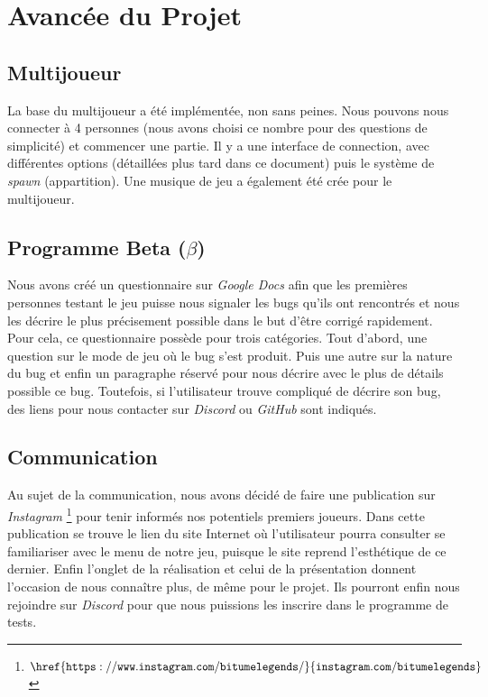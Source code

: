 \documentclass[12pt,a4paper]{article}
\begin{document}
\section{Avancée du Projet}
    \subsection{Multijoueur}
        La base du multijoueur a été implémentée, non sans peines. 
        Nous pouvons nous connecter à 4 personnes (nous avons choisi ce nombre pour des questions 
        de simplicité) et commencer une partie. Il y a une interface de connection, avec différentes 
        options (détaillées plus tard dans ce document) puis le système de \textit{spawn} (appartition).
        Une musique de jeu a également été crée pour le multijoueur.
  
    \subsection{Programme Beta (\(\beta\))}
        Nous avons créé un questionnaire sur \textsl{Google Docs} afin que les premières personnes testant
        le jeu puisse nous signaler les bugs qu'ils ont rencontrés et nous les décrire le plus 
        précisement possible dans le but d'être corrigé rapidement. Pour cela, ce questionnaire 
        possède pour trois catégories. Tout d'abord, une question sur le mode de jeu où le bug 
        s'est produit. Puis une autre sur la nature du bug et enfin un paragraphe réservé
        pour nous décrire avec le plus de détails possible ce bug. Toutefois, si l'utilisateur
        trouve compliqué de décrire son bug, des liens pour nous contacter sur \textsl{Discord} 
        ou \textsl{GitHub} sont indiqués.
  
    \subsection{Communication}
        Au sujet de la communication, nous avons décidé de faire une publication sur \textsl{Instagram}
        \footnote{\(\mathtt{\href{https://www.instagram.com/bitumelegends/}{instagram.com/bitumelegends}}\)}
        pour tenir informés nos potentiels premiers joueurs. Dans cette publication se trouve le lien 
        du site Internet où l'utilisateur pourra consulter se familiariser avec le menu de notre
        jeu, puisque le site reprend l'esthétique de ce dernier. Enfin l'onglet de la réalisation
        et celui de la présentation donnent l'occasion de nous connaître plus, de même pour le projet.
        Ils pourront enfin nous rejoindre sur \textsl{Discord} pour que nous puissions les inscrire dans le
        programme de tests.
  
\end{document}
